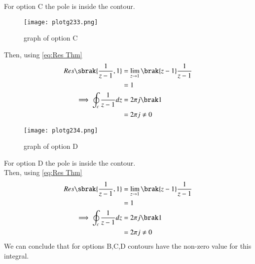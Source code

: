 \documentclass[journal,12pt,twocolumn]{IEEEtran}
\theoremstyle{remark}
\begin{document}
For option C the pole is inside the contour.\\
\begin{figure}
    \centering
    \texttt{[image: plotg233.png]}
    \caption{graph of option C}
\end{figure}
Then, using \eqref{eq:Res Thm}
\begin{align}
Res\sbrak{\frac{1}{z-1},1} &=\lim_{z\to 1}\brak{z-1}\frac{1}{z-1}\\
\notag &=1\\
\implies \oint_{c}\frac{1}{z-1}dz&=2\pi j\brak 1\\
\notag &=2\pi j\neq 0
\end{align}
\begin{figure}[h!]
    \centering
    \texttt{[image: plotg234.png]}
    \caption{graph of option D}
\end{figure}
For option D the pole is inside the contour.\\
Then, using \eqref{eq:Res Thm}
\begin{align}
Res\sbrak{\frac{1}{z-1},1} &=\lim_{z\to 1}\brak{z-1}\frac{1}{z-1}\\
\notag &=1\\
\implies \oint_{c}\frac{1}{z-1}dz&=2\pi j\brak 1\\
\notag &=2\pi j\neq 0
\end{align}
We can conclude that for options B,C,D contours have the non-zero value for this integral.
\end{document}
